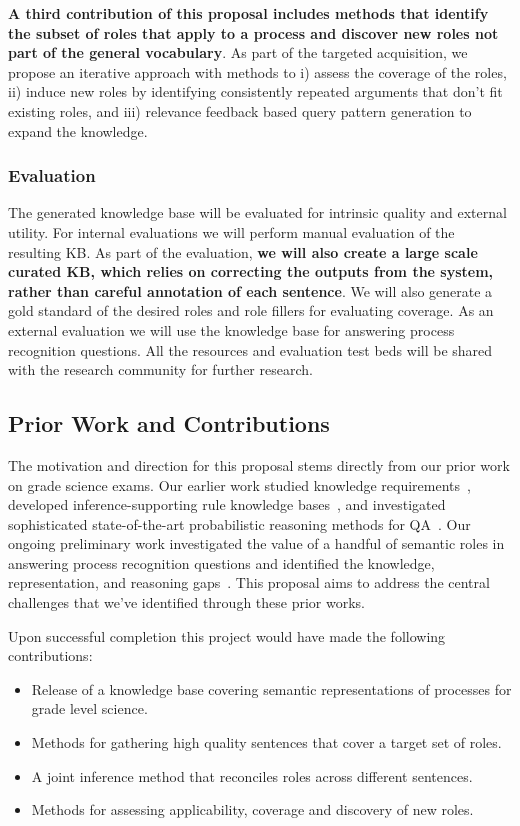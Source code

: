 {\bf A third contribution of this proposal includes methods that identify the subset of roles that apply to a process and discover new roles not part of the general vocabulary}. 
As part of the targeted acquisition, we propose an iterative approach with methods to i) assess the coverage of the roles, ii) induce new roles by identifying consistently repeated arguments that don't fit existing roles, and iii) relevance feedback based query pattern generation to expand the knowledge.

\subsubsection*{Evaluation}

The generated knowledge base will be evaluated for intrinsic quality and external utility. For internal evaluations we will perform manual evaluation of the resulting KB. As part of the evaluation, {\bf we will also create a large scale curated KB, which relies on correcting the outputs from the system, rather than careful annotation of each sentence}. We will also generate a gold standard of the desired roles and role fillers for evaluating coverage. As an external evaluation we will use the knowledge base for answering process recognition questions. All the resources and evaluation test beds will be shared with the research community for further research.

\subsection{Prior Work and Contributions}

The motivation and direction for this proposal stems directly from our prior work on grade science exams.  Our earlier work studied knowledge requirements~\cite{chb2013:akbc}, developed inference-supporting rule knowledge bases~\cite{clark2014:akbc}, and investigated sophisticated state-of-the-art probabilistic reasoning methods for QA~\cite{khot2015:emlnlp}. Our ongoing preliminary work investigated the value of a handful of semantic roles in answering process recognition questions and identified the knowledge, representation, and reasoning gaps~\cite{louvan2015:kcap}. This proposal aims to address the central challenges that we've identified through these prior works.

Upon successful completion this project would have made the following contributions:
\begin{itemize}
\item Release of a knowledge base covering semantic representations of processes for grade level science.
\item Methods for gathering high quality sentences that cover a target set of roles. 
\item A joint inference method that reconciles roles across different sentences.  
\item Methods for assessing applicability, coverage and discovery of new roles.
\end{itemize}



